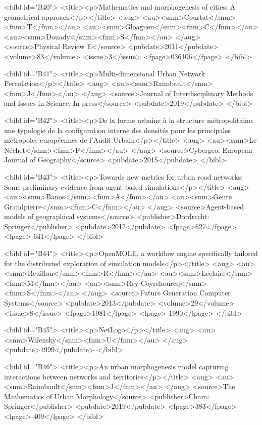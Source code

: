 \documentclass{article}
\begin{document}
{<bibl id="B40">
  <title><p>Mathematics and morphogenesis of cities: A geometrical
  approach</p></title>
  <aug>
    <au><snm>Courtat</snm><fnm>T</fnm></au>
    <au><snm>Gloaguen</snm><fnm>C</fnm></au>
    <au><snm>Douady</snm><fnm>S</fnm></au>
  </aug>
  <source>Physical Review E</source>
  <pubdate>2011</pubdate>
  <volume>83</volume>
  <issue>3</issue>
  <fpage>036106</fpage>
</bibl>

<bibl id="B41">
  <title><p>Multi-dimensional Urban Network Percolation</p></title>
  <aug>
    <au><snm>Raimbault</snm><fnm>J</fnm></au>
  </aug>
  <source>Journal of Interdisciplinary Methods and Issues in Science. In
  press</source>
  <pubdate>2019</pubdate>
</bibl>

<bibl id="B42">
  <title><p>De la forme urbaine {\`a} la structure m{\'e}tropolitaine: une
  typologie de la configuration interne des densit{\'e}s pour les principales
  m{\'e}tropoles europ{\'e}ennes de l'Audit Urbain</p></title>
  <aug>
    <au><snm>Le N{\'e}chet</snm><fnm>F</fnm></au>
  </aug>
  <source>Cybergeo: European Journal of Geography</source>
  <pubdate>2015</pubdate>
</bibl>

<bibl id="B43">
  <title><p>Towards new metrics for urban road networks: Some preliminary
  evidence from agent-based simulations</p></title>
  <aug>
    <au><snm>Banos</snm><fnm>A</fnm></au>
    <au><snm>Genre Grandpierre</snm><fnm>C</fnm></au>
  </aug>
  <source>Agent-based models of geographical systems</source>
  <publisher>Dordrecht: Springer</publisher>
  <pubdate>2012</pubdate>
  <fpage>627</fpage>
  <lpage>-641</lpage>
</bibl>

<bibl id="B44">
  <title><p>OpenMOLE, a workflow engine specifically tailored for the
  distributed exploration of simulation models</p></title>
  <aug>
    <au><snm>Reuillon</snm><fnm>R</fnm></au>
    <au><snm>Leclaire</snm><fnm>M</fnm></au>
    <au><snm>Rey Coyrehourcq</snm><fnm>S</fnm></au>
  </aug>
  <source>Future Generation Computer Systems</source>
  <pubdate>2013</pubdate>
  <volume>29</volume>
  <issue>8</issue>
  <fpage>1981</fpage>
  <lpage>-1990</lpage>
</bibl>

<bibl id="B45">
  <title><p>NetLogo</p></title>
  <aug>
    <au><snm>Wilensky</snm><fnm>U</fnm></au>
  </aug>
  <pubdate>1999</pubdate>
</bibl>

<bibl id="B46">
  <title><p>An urban morphogenesis model capturing interactions between
  networks and territories</p></title>
  <aug>
    <au><snm>Raimbault</snm><fnm>J</fnm></au>
  </aug>
  <source>The Mathematics of Urban Morphology</source>
  <publisher>Cham: Springer</publisher>
  <pubdate>2019</pubdate>
  <fpage>383</fpage>
  <lpage>-409</lpage>
</bibl>

}
\end{document}
